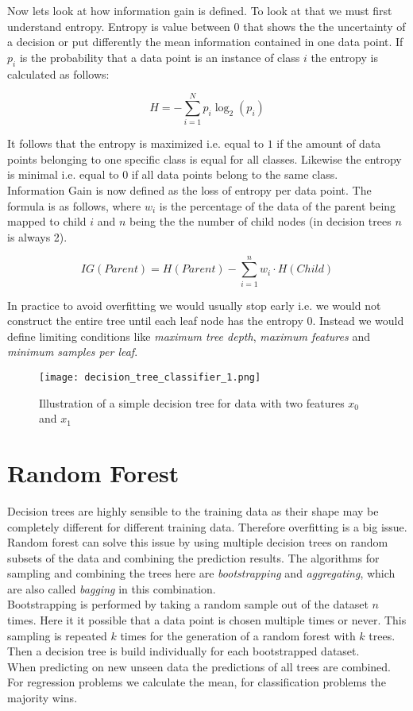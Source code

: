Now lets look at how information gain is defined. To look at that we must first understand entropy. Entropy is value between 0 that shows the the uncertainty of a decision or put differently the mean information contained in one data point. If $p_{i}$ is the probability that a data point is an instance of class $i$ the entropy is calculated as follows:

$$
    H = -\sum_{i=1}^{N}p_i \log_2{(p_i)}
$$

It follows that the entropy is maximized i.e. equal to $1$ if the amount of data points belonging to one specific class is equal for all classes. Likewise the entropy is minimal i.e. equal to $0$ if all data points belong to the same class.\\

Information Gain is now defined as the loss of entropy per data point. The formula is as follows, where $w_{i}$ is the percentage of the data of the parent being mapped to child $i$ and $n$ being the the number of child nodes (in decision trees $n$ is always 2).

$$
    IG(Parent) =  H(Parent) - \sum_{i=1}^{n} w_{i} \cdot H(Child)
$$

In practice to avoid overfitting we would usually stop early i.e. we would not construct the entire tree until each leaf node has the entropy 0. Instead we would define limiting conditions like \textit{maximum tree depth}, \textit{maximum features} and \textit{minimum samples per leaf}.

\begin{figure}[h]
    \centering
    \texttt{[image: decision\_tree\_classifier\_1.png]}
    \caption{Illustration of a simple decision tree for data with two features $x_{0}$ and $x_{1}$}
    \label{fig:mlp}
\end{figure}


\section{Random Forest}

Decision trees are highly sensible to the training data as their shape may be completely different for different training data. Therefore overfitting is a big issue. Random forest can solve this issue by using multiple decision trees on random subsets of the data and combining the prediction results. The algorithms for sampling and combining the trees here are \textit{bootstrapping} and \textit{aggregating}, which are also called \textit{bagging} in this combination.\\
Bootstrapping is performed by taking a random sample out of the dataset $n$ times. Here it it possible that a data point is chosen multiple times or never. This sampling is repeated $k$ times for the generation of a random forest with $k$ trees. Then a decision tree is build individually for each bootstrapped dataset.\\
When predicting on new unseen data the predictions of all trees are combined. For regression problems we calculate the mean, for classification problems the majority wins.

